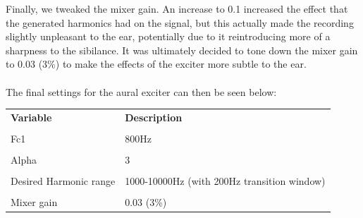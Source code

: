 \documentclass[12pt]{extarticle}
\begin{document}
Finally, we tweaked the mixer gain. An increase to 0.1 increased the effect that the generated harmonics had on the signal, but this actually made the recording slightly unpleasant to the ear, potentially due to it reintroducing more of a sharpness to the sibilance. It was ultimately decided to tone down the mixer gain to 0.03 (3\%) to make the effects of the exciter more subtle to the ear.\\\\
The final settings for the aural exciter can then be seen below:\\

\begin{center}
\begin{tabular}{ | m{7cm}| m{10cm} | } 
  \hline
  \textbf{Variable} & \textbf{Description} \\\\ 
  \hline
  Fc1 & 800Hz\\\\ 
  \hline
  Alpha & 3 \\\\ 
  \hline
  Desired Harmonic range & 1000-10000Hz (with 200Hz transition window) \\\\
  \hline
  Mixer gain & 0.03 (3\%)\\
  \hline
\end{tabular}
\end{center}
\end{document}
